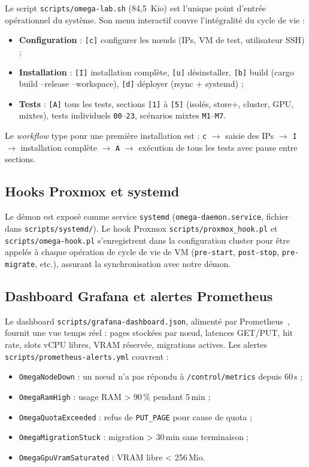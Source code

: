 Le script \texttt{scripts/omega-lab.sh} (84,5~Kio) est l'unique point d'entrée opérationnel du système. Son menu interactif couvre l'intégralité du cycle de vie :

\begin{itemize}[leftmargin=*]
    \item \textbf{Configuration} : \texttt{[c]} configurer les nœuds (IPs, VM de test, utilisateur SSH) ;
    \item \textbf{Installation} : \texttt{[I]} installation complète, \texttt{[u]} désinstaller, \texttt{[b]} build (cargo build --release --workspace), \texttt{[d]} déployer (rsync + systemd) ;
    \item \textbf{Tests} : \texttt{[A]} tous les tests, sections \texttt{[1]} à \texttt{[5]} (isolés, store+, cluster, GPU, mixtes), tests individuels \texttt{00}--\texttt{23}, scénarios mixtes \texttt{M1}--\texttt{M7}.
\end{itemize}

Le \emph{workflow} type pour une première installation est : \texttt{c} $\to$ saisie des IPs $\to$ \texttt{I} $\to$ installation complète $\to$ \texttt{A} $\to$ exécution de tous les tests avec pause entre sections.

\subsection{Hooks Proxmox et systemd}

Le démon est exposé comme service \texttt{systemd} (\texttt{omega-daemon.service}, fichier dans \texttt{scripts/systemd/}). Le hook Proxmox \texttt{scripts/proxmox\_hook.pl} et \texttt{scripts/omega-hook.pl} s'enregistrent dans la configuration cluster pour être appelés à chaque opération de cycle de vie de VM (\texttt{pre-start}, \texttt{post-stop}, \texttt{pre-migrate}, etc.), assurant la synchronisation avec notre démon.

\subsection{Dashboard Grafana et alertes Prometheus}

Le dashboard \texttt{scripts/grafana-dashboard.json}, alimenté par Prometheus~\cite{prometheus_doc}, fournit une vue temps réel : pages stockées par nœud, latences GET/PUT, hit rate, slots vCPU libres, VRAM réservée, migrations actives. Les alertes \texttt{scripts/prometheus-alerts.yml} couvrent :
\begin{itemize}[leftmargin=*]
    \item \texttt{OmegaNodeDown} : un nœud n'a pas répondu à \texttt{/control/metrics} depuis 60\,s ;
    \item \texttt{OmegaRamHigh} : usage RAM > 90\,\% pendant 5\,min ;
    \item \texttt{OmegaQuotaExceeded} : refus de \texttt{PUT\_PAGE} pour cause de quota ;
    \item \texttt{OmegaMigrationStuck} : migration > 30\,min sans terminaison ;
    \item \texttt{OmegaGpuVramSaturated} : VRAM libre < 256\,Mio.
\end{itemize}

